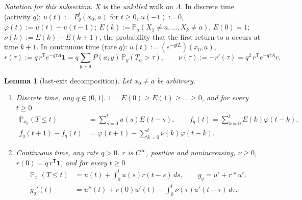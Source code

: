 \documentclass[11pt,a4paper]{article}
\newtheorem{lemma}[theorem]{Lemma}
\theoremstyle{definition}
\newcommand{\one}{\mathbf 1}
\newcommand{\Prob}{\mathbb P}
\newcommand{\T}{^{\mathsf T}}
\begin{document}
\emph{Notation for this subsection.} $X$ is the \emph{unkilled} walk on $\Lambda$. In discrete time (activity $q$): $u(t):=P_q^t(x_0,a)$ for $t\ge0$, $u(-1):=0$, $\varphi(t):=u(t)-u(t-1)$; $E(k):=\Prob_a(X_1\ne a,\dots,X_k\ne a)$, $E(0)=1$; $\nu(k):=E(k)-E(k+1)$, the probability that the first return to $a$ occurs at time $k+1$. In continuous time (rate $q$): $u(t):=(e^{-qtL})(x_0,a)$,
\[
r(\tau):=q\,r\T e^{-q\tau A}\one=q\sum_{y\sim a}P(a,y)\,\Prob_y(T_a>\tau),\qquad \nu(\tau):=-r'(\tau)=q^2\,r\T e^{-q\tau A}r .
\]

\begin{lemma}[last-exit decomposition]\label{lem:lastexit}
Let $x_0\ne a$ be arbitrary.
\begin{enumerate}
\item[(a)] \emph{Discrete time, any $q\in(0,1]$.} $1=E(0)\ge E(1)\ge\dots\ge0$, and for every $t\ge0$
\begin{align}
\Prob_{x_0}(T\le t)&=\sum_{s=0}^tu(s)E(t-s),\qquad f_q(t)=\sum_{k=0}^tE(k)\varphi(t-k),\label{eq:ledisc}\\
f_q(t+1)-f_q(t)&=\varphi(t+1)-\sum_{k=0}^t\nu(k)\varphi(t-k).\label{eq:lediff}
\end{align}
\item[(b)] \emph{Continuous time, any rate $q>0$.} $r$ is $C^\infty$, positive and nonincreasing, $\nu\ge0$, $r(0)=q\,r\T\one$, and for every $t\ge0$
\begin{align}
\Prob_{x_0}(T\le t)&=u(t)+\int_0^tu(s)r(t-s)\,ds,\qquad g_q=u'+r*u',\label{eq:lecont}\\
g_q'(t)&=u''(t)+r(0)u'(t)-\int_0^t\nu(\tau)u'(t-\tau)\,d\tau .\label{eq:lederiv}
\end{align}
\end{enumerate}
\end{lemma}
\end{document}
